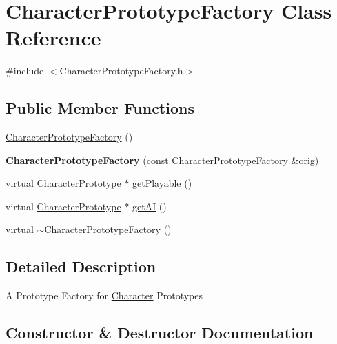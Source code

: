 \hypertarget{classCharacterPrototypeFactory}{}\section{Character\+Prototype\+Factory Class Reference}
\label{classCharacterPrototypeFactory}


{\ttfamily \#include $<$Character\+Prototype\+Factory.\+h$>$}

\subsection*{Public Member Functions}
\begin{DoxyCompactItemize}
\item 
\hyperlink{classCharacterPrototypeFactory_a0980d1087a9a5456cb151fcf5b4b0a6d}{Character\+Prototype\+Factory} ()
\item 
{\bfseries Character\+Prototype\+Factory} (const \hyperlink{classCharacterPrototypeFactory}{Character\+Prototype\+Factory} \&orig)\hypertarget{classCharacterPrototypeFactory_a488cb5f74bda3a6c8594745a84c79a9f}{}\label{classCharacterPrototypeFactory_a488cb5f74bda3a6c8594745a84c79a9f}

\item 
virtual \hyperlink{classCharacterPrototype}{Character\+Prototype} $\ast$ \hyperlink{classCharacterPrototypeFactory_a4d2046b26fa5c620ef35719c3893c03c}{get\+Playable} ()
\item 
virtual \hyperlink{classCharacterPrototype}{Character\+Prototype} $\ast$ \hyperlink{classCharacterPrototypeFactory_a1101cdf1640bed732c339b9994c6bb1e}{get\+AI} ()
\item 
virtual \hyperlink{classCharacterPrototypeFactory_aafffdccd0b32a145f3fb8d38002cf761}{$\sim$\+Character\+Prototype\+Factory} ()
\end{DoxyCompactItemize}


\subsection{Detailed Description}
A Prototype Factory for \hyperlink{classCharacter}{Character} Prototypes 

\subsection{Constructor \& Destructor Documentation}
